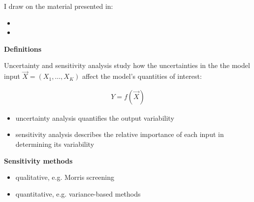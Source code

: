 \begin{frame} I draw on the material presented in:

\begin{itemize}\setlength\itemsep{1em}
  \item {}
  \item {}
\end{itemize}

\end{frame}
\begin{frame}\textbf{Definitions}\vspace{0.3cm}

Uncertainty and sensitivity analysis study how the uncertainties in the the model input $\vec{X} = (X_1, \hdots, X_K)$ affect the model's quantities of interest:

\begin{align*}
  Y = f(\vec{X})
\end{align*}


\begin{itemize}\setlength\itemsep{1em}
  \item uncertainty analysis quantifies the output variability
  \item sensitivity analysis describes the relative importance of each input in determining its variability
\end{itemize}

\end{frame}

\begin{frame}\textbf{Sensitivity methods}\vspace{0.3cm}

\begin{itemize}\setlength\itemsep{1em}
\item qualitative, e.g. Morris screening
\item quantitative, e.g. variance-based methods
\end{itemize}

\end{frame}

